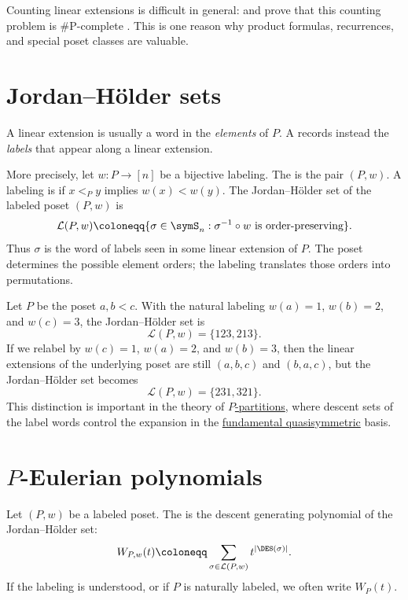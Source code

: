 Counting linear extensions is difficult in general: 
and  prove that this counting problem is
\#P-complete \cite{BrightwellWinkler1991}.  This is one reason why product
formulas, recurrences, and special poset classes are valuable.

\section[jordanHolderSet]{Jordan--Hölder sets}

A linear extension is usually a word in the \emph{elements} of $P$.  A
 records instead the
\emph{labels} that appear along a linear extension.

More precisely, let $w:P\to [n]$ be a bijective labeling.  The
\label{labeledPoset} is the pair $(P,w)$.  A labeling is
\label{naturalLabeling} if $x\lt_P y$ implies
$w(x)\lt w(y)$.  The Jordan--Hölder set of the labeled poset $(P,w)$ is
\[
  \mathcal{L}(P,w)
  \coloneqq
  \{\sigma\in\symS_n : \sigma^{-1}\circ w \text{ is order-preserving}\}.
\]
Thus $\sigma$ is the word of labels seen in some linear extension of $P$.
The poset determines the possible element orders; the labeling translates
those orders into permutations.

\begin{example*}
Let $P$ be the poset $a,b\lt c$.  With the natural labeling
$w(a)=1$, $w(b)=2$, and $w(c)=3$, the Jordan--Hölder set is
\[
  \mathcal{L}(P,w)=\{123,213\}.
\]
If we relabel by $w(c)=1$, $w(a)=2$, and $w(b)=3$, then the linear extensions
of the underlying poset are still $(a,b,c)$ and $(b,a,c)$, but the
Jordan--Hölder set becomes
\[
  \mathcal{L}(P,w)=\{231,321\}.
\]
This distinction is important in the theory of
\hyperref[pPartition]{$P$-partitions}, where descent sets of the label words
control the expansion in the \hyperref[gessel]{fundamental quasisymmetric}
basis.
\end{example*}

\section[pEulerianPolynomial]{$P$-Eulerian polynomials}

Let $(P,w)$ be a labeled poset.  The
 is the descent
generating polynomial of the Jordan--Hölder set:
\[
  W_{P,w}(t)
  \coloneqq
  \sum_{\sigma\in\mathcal{L}(P,w)} t^{|\DES(\sigma)|}.
\]
If the labeling is understood, or if $P$ is naturally labeled, we often write
$W_P(t)$.


